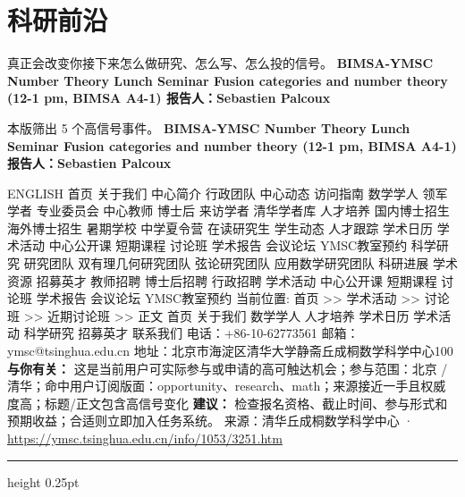 \documentclass[10.5pt]{ctexart}
\begin{document}
\section*{科研前沿}
{\color{ormuted} 真正会改变你接下来怎么做研究、怎么写、怎么投的信号。}
\vspace{2mm}
{\LARGE\bfseries BIMSA-YMSC Number Theory Lunch Seminar Fusion categories and number theory (12-1 pm, BIMSA A4-1) 报告人：Sebastien Palcoux}\par
\vspace{1mm}
{\color{ormuted} 本版筛出 5 个高信号事件。}
\vspace{3mm}
{\Large\bfseries BIMSA-YMSC Number Theory Lunch Seminar Fusion categories and number theory (12-1 pm, BIMSA A4-1) 报告人：Sebastien Palcoux}\par
ENGLISH 首页 关于我们 中心简介 行政团队 中心动态 访问指南 数学学人 领军学者 专业委员会 中心教师 博士后 来访学者 清华学者库 人才培养 国内博士招生 海外博士招生 暑期学校 中学夏令营 在读研究生 学生动态 人才跟踪 学术日历 学术活动 中心公开课 短期课程 讨论班 学术报告 会议论坛 YMSC教室预约 科学研究 研究团队 双有理几何研究团队 弦论研究团队 应用数学研究团队 科研进展 学术资源 招募英才 教师招聘 博士后招聘 行政招聘 学术活动 中心公开课 短期课程 讨论班 学术报告 会议论坛 YMSC教室预约 当前位置: 首页 >> 学术活动 >> 讨论班 >> 近期讨论班 >> 正文 首页 关于我们 数学学人 人才培养 学术日历 学术活动 科学研究 招募英才 联系我们 电话：+86-10-62773561 邮箱：ymsc@tsinghua.edu.cn 地址：北京市海淀区清华大学静斋丘成桐数学科学中心100
\textbf{与你有关：} 这是当前用户可实际参与或申请的高可触达机会；参与范围：北京 / 清华；命中用户订阅版面：opportunity、research、math；来源接近一手且权威度高；标题/正文包含高信号变化
\textbf{建议：} 检查报名资格、截止时间、参与形式和预期收益；合适则立即加入任务系统。
{\footnotesize\color{ormuted} 来源：清华丘成桐数学科学中心 · \url{https://ymsc.tsinghua.edu.cn/info/1053/3251.htm}}
\vspace{4mm}
\hrule height 0.25pt
\vspace{3mm}
\end{document}

